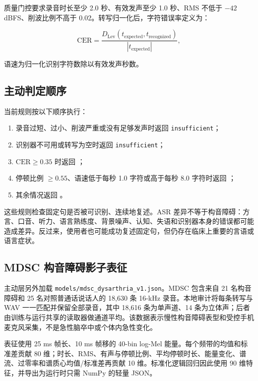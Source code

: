\documentclass[11pt,a4paper]{article}
\begin{document}
质量门控要求录音时长至少 2.0 秒、有效发声至少 1.0 秒、RMS 不低于 $-42$ dBFS、削波比例不高于 0.02。转写归一化后，字符错误率定义为：

\begin{equation}
\mathrm{CER}=\frac{D_{\mathrm{Lev}}(t_{\mathrm{expected}},t_{\mathrm{recognized}})}
{|t_{\mathrm{expected}}|},
\end{equation}

语速为归一化识别字符数除以有效发声秒数。

\subsection{主动判定顺序}

当前规则按以下顺序执行：

\begin{enumerate}
  \item 录音过短、过小、削波严重或没有足够发声时返回 \texttt{insufficient}；
  \item 识别器不可用或转写为空时返回 \texttt{insufficient}；
  \item $\mathrm{CER}\geq0.35$ 时返回 ；
  \item 停顿比例 $\geq0.55$、语速低于每秒 1.0 字符或高于每秒 8.0 字符时返回 ；
  \item 其余情况返回 。
\end{enumerate}

这些规则检查固定句是否被可识别、连续地复述。ASR 差异不等于构音障碍：方言、口音、听力、语言熟练度、背景噪声、认知、失语和识别器本身的错误都可能造成差异。反过来，使用者也可能成功复述固定句，但仍存在临床上重要的言语或语言症状。

\subsection{MDSC 构音障碍影子表征}

主动层另外加载 \texttt{models/mdsc\_dysarthria\_v1.json}。MDSC 包含来自 21 名构音障碍和 25 名对照普通话说话人的 18,630 条 16-kHz 录音\cite{gao2024mdsc}。本地审计将每条转写与 WAV 一一匹配并保留全部录音，其中 18,616 条为单声道、14 条为立体声；后者由训练与运行共享的读取器做通道平均。该数据表示慢性构音障碍表型和受控手机麦克风采集，不是急性脑卒中或个体内急性变化。

表征使用 25 ms 帧长、10 ms 帧移的 40-bin log-Mel 能量。每个频带的均值和标准差贡献 80 维；时长、RMS、有声与停顿比例、平均停顿时长、能量变化、谱流、过零率和谱质心均值/标准差再贡献 10 维。标准化逻辑回归因此使用 90 维特征，并导出为运行时只需 NumPy 的轻量 JSON。
\end{document}
